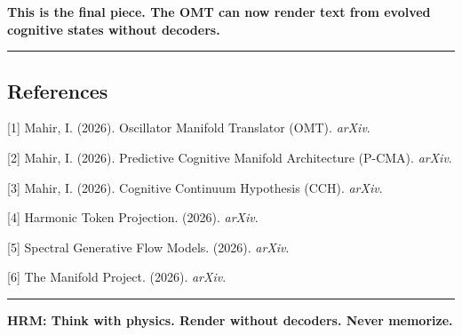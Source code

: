 \documentclass[
  11pt,
  a4paper,
]{article}
\begin{document}
\textbf{This is the final piece. The OMT can now render text from
evolved cognitive states without decoders.}

\begin{center}\rule{0.5\linewidth}{0.5pt}\end{center}

\subsection{References}\label{references}

{[}1{]} Mahir, I. (2026). Oscillator Manifold Translator (OMT).
\emph{arXiv}.

{[}2{]} Mahir, I. (2026). Predictive Cognitive Manifold Architecture
(P-CMA). \emph{arXiv}.

{[}3{]} Mahir, I. (2026). Cognitive Continuum Hypothesis (CCH).
\emph{arXiv}.

{[}4{]} Harmonic Token Projection. (2026). \emph{arXiv}.

{[}5{]} Spectral Generative Flow Models. (2026). \emph{arXiv}.

{[}6{]} The Manifold Project. (2026). \emph{arXiv}.

\begin{center}\rule{0.5\linewidth}{0.5pt}\end{center}

\textbf{HRM: Think with physics. Render without decoders. Never
memorize.}
\end{document}
